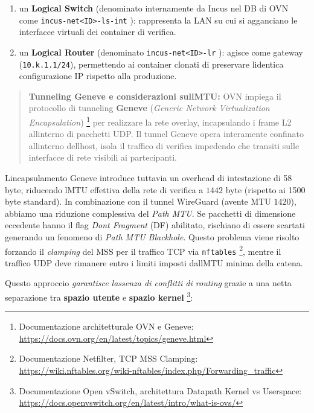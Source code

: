 \begin{enumerate}
\def\labelenumi{\arabic{enumi}.}
\tightlist
\item
  un \textbf{Logical Switch} (denominato internamente da Incus nel DB di
  OVN come \passthrough{\lstinline!incus-net<ID>-ls-int!} ):
  rappresenta la LAN su cui si agganciano le interfacce virtuali dei
  container di verifica.
\item
  un \textbf{Logical Router} (denominato
  \passthrough{\lstinline!incus-net<ID>-lr!} ):
  agisce come gateway (\passthrough{\lstinline!10.k.1.1/24!}),
  permettendo ai container clonati di preservare
  l\textquotesingle identica configurazione IP rispetto alla produzione.
\end{enumerate}

\begin{quote}
\textbf{Tunneling Geneve e considerazioni sull\textquotesingle MTU:} OVN
impiega il protocollo di tunneling \textbf{Geneve} (\emph{Generic
Network Virtualization Encapsulation}) \footnote{\label{fn:ref_17}Documentazione
  architetturale OVN e Geneve:
  \url{https://docs.ovn.org/en/latest/topics/geneve.html}} per
realizzare la rete overlay, incapsulando i frame L2
all\textquotesingle interno di pacchetti UDP. Il tunnel Geneve opera
interamente confinato all\textquotesingle interno
dell\textquotesingle host, isola il traffico di verifica impedendo che
transiti sulle interfacce di rete visibili ai partecipanti.
\end{quote}

L\textquotesingle incapsulamento Geneve introduce tuttavia un overhead
di intestazione di 58 byte, riducendo l\textquotesingle MTU effettiva
della rete di verifica a \(1442\) byte (rispetto ai 1500 byte standard).
In combinazione con il tunnel WireGuard (avente MTU \(1420\)), abbiamo
una riduzione complessiva del \emph{Path MTU}. Se pacchetti di
dimensione eccedente hanno il flag \emph{Don\textquotesingle t Fragment}
(DF) abilitato, rischiano di essere scartati generando un fenomeno di
\emph{Path MTU Blackhole}. Questo problema viene risolto forzando il
\emph{clamping} del MSS per il traffico TCP via
\passthrough{\lstinline!nftables!} \footnote{\label{fn:ref_18}Documentazione Netfilter,
  TCP MSS Clamping:
  \url{https://wiki.nftables.org/wiki-nftables/index.php/Forwarding_traffic}},
mentre il traffico UDP deve rimanere entro i limiti imposti
dall\textquotesingle MTU minima della catena.

Questo approccio \emph{garantisce l\textquotesingle assenza di conflitti
di routing} grazie a una netta separazione tra \textbf{spazio utente} e
\textbf{spazio kernel} \footnote{\label{fn:ref_19}Documentazione Open vSwitch,
  architettura Datapath Kernel vs Userspace:
  \url{https://docs.openvswitch.org/en/latest/intro/what-is-ovs/}}:

